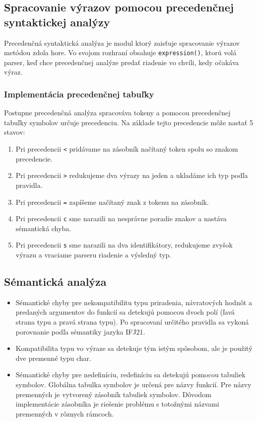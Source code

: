 \documentclass[a4paper, 11pt]{article}
\begin{document}
    \subsection{Spracovanie výrazov pomocou precedenčnej syntaktickej analýzy}
    Precedenčná syntaktická analýza je modul ktorý zaisťuje spracovanie výrazov metódou zdola hore.
    Vo svojom rozhraní obsahuje \texttt{expression()}, ktorú volá parser, keď chce precedenčnej analýze predať
    riadenie vo chvíli, kedy očakáva výraz.
    \subsubsection{Implementácia precedenčnej tabuľky}
    Postupne precedenčná analýza spracováva tokeny a pomocou precedenčnej tabuľky symbolov
    určuje precedenciu. Na základe tejto precedencie môže nastať 5 stavov:
    \begin{enumerate}
        \item Pri precedencii \texttt{<} pridávame na zásobník načítaný token spolu so znakom precedencie.
        \item Pri precedencii \texttt{>} redukujeme dva výrazy na jeden a ukladáme ich typ podľa pravidla.
        \item Pri precedencii \texttt{=} zapíšeme načítaný znak z tokenu na zásobník.
        \item Pri precedencii \texttt{c} sme narazili na nesprávne poradie znakov a nastáva sémantická chyba.
        \item Pri precedencii \texttt{s} sme narazili na dva identifikátory, redukujeme zvyšok výrazu a vraciame parseru riadenie a výsledný typ.
    \end{enumerate}
    \subsection{Sémantická analýza}

    \begin{itemize}
        \item Sémantické chyby pre nekompatibilitu typu priradenia, návratových hodnôt a predaných
        argumentov do funkcií sa detekujú pomocou dvoch polí (ľavá strana typu a pravá strana typu). Po spracovaní
        určitého pravidla sa vykoná porovnanie podľa sémantiky jazyka IFJ21.

        \item Kompatibilita typu vo výraze sa detekuje tým istým spôsobom, ale je použitý dve premenné typu char.

        \item Sémantické chyby pre nedefiníciu, redefiníciu sa detekujú pomocou tabuliek symbolov. Globálna tabulka
        symbolov je určená pre názvy funkcií. Pre názvy premenných je vytvorený zásobník
        tabuliek symbolov. Dôvodom implementácie zásobníka je riešenie problému s totožnými názvami premenných v
        rôznych rámcoch.
    \end{itemize}
\end{document}
